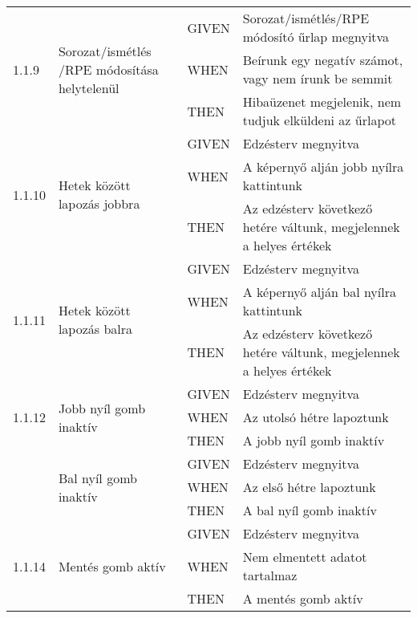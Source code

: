 \begin{center}
\begin{longtable}{ | p{} | p{} | p{} | p{} | }
			\multirow{3}{*}{1.1.9} 
			& \multirow{3}{=}{Sorozat/ismétlés /RPE módosítása helytelenül} 
			& GIVEN 
			& Sorozat/ismétlés/RPE módosító űrlap megnyitva \\
			\cline{3-4}
			& & WHEN 
			& Beírunk egy negatív számot, vagy nem írunk be semmit \\
			\cline{3-4}
			& & THEN 
			& Hibaüzenet megjelenik, nem tudjuk elküldeni az űrlapot \\
			\hline



			\multirow{3}{*}{1.1.10} 
			& \multirow{3}{=}{Hetek között lapozás jobbra} 
			& GIVEN 
			& Edzésterv megnyitva \\
			\cline{3-4}
			& & WHEN 
			& A képernyő alján jobb nyílra kattintunk \\
			\cline{3-4}
			& & THEN 
			& Az edzésterv következő hetére váltunk, megjelennek a helyes értékek \\
			\hline

			\multirow{3}{*}{1.1.11} 
			& \multirow{3}{=}{Hetek között lapozás balra} 
			& GIVEN 
			& Edzésterv megnyitva \\
			\cline{3-4}
			& & WHEN 
			& A képernyő alján bal nyílra kattintunk \\
			\cline{3-4}
			& & THEN 
			& Az edzésterv következő hetére váltunk, megjelennek a helyes értékek \\
			\hline

			\multirow{3}{*}{1.1.12} 
			& \multirow{3}{=}{Jobb nyíl gomb inaktív} 
			& GIVEN 
			& Edzésterv megnyitva \\
			\cline{3-4}
			& & WHEN 
			& Az utolsó hétre lapoztunk \\
			\cline{3-4}
			& & THEN 
			& A jobb nyíl gomb inaktív \\
			\hline

			\pagebreak

			\multirow{3}{*}{1.1.13} 
			& \multirow{3}{=}{Bal nyíl gomb inaktív} 
			& GIVEN 
			& Edzésterv megnyitva \\
			\cline{3-4}
			& & WHEN 
			& Az első hétre lapoztunk \\
			\cline{3-4}
			& & THEN 
			& A bal nyíl gomb inaktív \\
			\hline

			\multirow{3}{*}{1.1.14} 
			& \multirow{3}{=}{Mentés gomb aktív} 
			& GIVEN 
			& Edzésterv megnyitva \\
			\cline{3-4}
			& & WHEN 
			& Nem elmentett adatot tartalmaz \\
			\cline{3-4}
			& & THEN 
			& A mentés gomb aktív \\
			\hline


\end{longtable}
\end{center}
